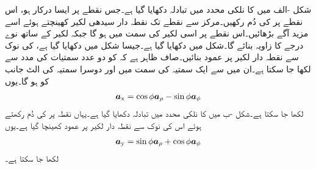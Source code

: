 شکل -الف میں  کا نلکی محدد میں تبادلہ دکھایا گیا ہے۔جس نقطے پر ایسا درکار ہو، اس نقطے پر  کی دُم رکھیں۔مرکز سے نقطے تک نقطہ دار سیدھی لکیر کھینچتے ہوئے اسے مزید آگے بڑھائیں۔اس نقطے پر  اسی لکیر کی سمت میں ہو گا جبکہ  لکیر کے ساتھ نوے درجے کا زاویہ بنائے گا۔شکل میں  دکھایا گیا ہے۔جیسا شکل میں دکھایا گیا ہے،  کی نوک سے نقطہ دار لکیر پر عمود بنائیں۔صاف ظاہر ہے کہ  کو دو عدد سمتیات کی مدد سے لکھا جا سکتا ہے۔ان میں سے ایک سمتیہ  کی سمت میں اور دوسرا سمتیہ  کی الٹ جانب کو ہو گا۔یوں
\begin{align}\label{مساوات_سمتیہ_اکائی_ایکس_نلکی_میں}
{\boldsymbol{a}}_{\textup{x}}=\cos \phi {\boldsymbol{a}}_{\rho}-\sin \phi {\boldsymbol{a}}_{\phi}
\end{align}
لکھا جا سکتا ہے۔شکل -ب میں  کا نلکی محدد میں تبادلہ دکھایا گیا ہے۔یہاں نقطہ پر  کی دُم رکھتے ہوئے اس کی نوک سے نقطہ دار لکیر پر عمود کھینچا گیا ہے۔یوں
\begin{align}\label{مساوات_سمتیہ_اکائی_وائے_نلکی_میں}
{\boldsymbol{a}}_{\textup{y}}=\sin \phi {\boldsymbol{a}}_{\rho}+\cos \phi {\boldsymbol{a}}_{\phi}
\end{align}
لکھا جا سکتا ہے۔


